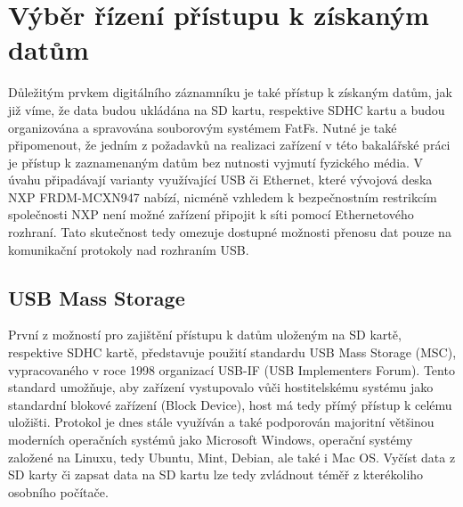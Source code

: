 
\section{Výběr řízení přístupu k získaným datům}
\label{vyber_rizeni_pristupu_k_ziskanym_datum}
Důležitým prvkem digitálního záznamníku je také přístup k získaným datům, jak již víme, že data budou ukládána na SD kartu, respektive SDHC kartu a budou organizována a spravována souborovým systémem FatFs. Nutné je také připomenout, že jedním z požadavků na realizaci zařízení v této bakalářské práci je přístup k zaznamenaným datům bez nutnosti vyjmutí fyzického média. V úvahu připadávají varianty využívající USB či Ethernet, které vývojová deska NXP FRDM-MCXN947 nabízí, nicméně vzhledem k bezpečnostním restrikcím společnosti NXP není možné zařízení připojit k síti pomocí Ethernetového rozhraní. Tato skutečnost tedy omezuje dostupné možnosti přenosu dat pouze na komunikační protokoly nad rozhraním USB. 


\subsection{USB Mass Storage}
\label{usb_mass_storage}
První z možností pro zajištění přístupu k datům uloženým na SD kartě, respektive SDHC kartě, představuje použití standardu USB Mass Storage (MSC), vypracovaného v roce 1998 organizací USB-IF (USB Implementers Forum). Tento standard umožňuje, aby zařízení vystupovalo vůči hostitelskému systému jako standardní blokové zařízení (Block Device), host má tedy přímý přístup k celému uložišti. Protokol je dnes stále využíván a také podporován majoritní většinou moderních operačních systémů jako Microsoft Windows, operační systémy založené na Linuxu, tedy Ubuntu, Mint, Debian, ale také i Mac OS. Vyčíst data z SD karty či zapsat data na SD kartu lze tedy zvládnout téměř z kterékoliho osobního počítače.

